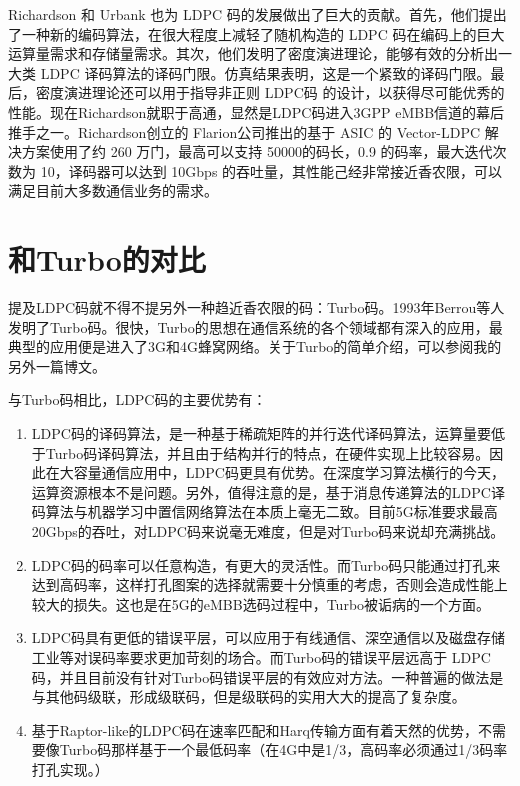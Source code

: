 \documentclass[10pt,a4paper,UTF8]{article}
\begin{document}
Richardson 和 Urbank 也为 LDPC 码的发展做出了巨大的贡献。首先，他们提出了一种新的编码算法，在很大程度上减轻了随机构造的 LDPC 码在编码上的巨大运算量需求和存储量需求。其次，他们发明了密度演进理论，能够有效的分析出一大类 LDPC 译码算法的译码门限。仿真结果表明，这是一个紧致的译码门限。最后，密度演进理论还可以用于指导非正则 LDPC码 的设计，以获得尽可能优秀的性能。现在Richardson就职于高通，显然是LDPC码进入3GPP eMBB信道的幕后推手之一。Richardson创立的 Flarion公司推出的基于 ASIC 的 Vector-LDPC 解决方案使用了约 260 万门，最高可以支持 50000的码长，0.9 的码率，最大迭代次数为 10，译码器可以达到 10Gbps 的吞吐量，其性能己经非常接近香农限，可以满足目前大多数通信业务的需求。
\section{和Turbo的对比}
\label{sec:org4bad585}


提及LDPC码就不得不提另外一种趋近香农限的码：Turbo码。1993年Berrou等人发明了Turbo码。很快，Turbo的思想在通信系统的各个领域都有深入的应用，最典型的应用便是进入了3G和4G蜂窝网络。关于Turbo的简单介绍，可以参阅我的另外一篇博文。

与Turbo码相比，LDPC码的主要优势有：
\begin{enumerate}
\item LDPC码的译码算法，是一种基于稀疏矩阵的并行迭代译码算法，运算量要低于Turbo码译码算法，并且由于结构并行的特点，在硬件实现上比较容易。因此在大容量通信应用中，LDPC码更具有优势。在深度学习算法横行的今天，运算资源根本不是问题。另外，值得注意的是，基于消息传递算法的LDPC译码算法与机器学习中置信网络算法在本质上毫无二致。目前5G标准要求最高20Gbps的吞吐，对LDPC码来说毫无难度，但是对Turbo码来说却充满挑战。

\item LDPC码的码率可以任意构造，有更大的灵活性。而Turbo码只能通过打孔来达到高码率，这样打孔图案的选择就需要十分慎重的考虑，否则会造成性能上较大的损失。这也是在5G的eMBB选码过程中，Turbo被诟病的一个方面。

\item LDPC码具有更低的错误平层，可以应用于有线通信、深空通信以及磁盘存储工业等对误码率要求更加苛刻的场合。而Turbo码的错误平层远高于 LDPC码，并且目前没有针对Turbo码错误平层的有效应对方法。一种普遍的做法是与其他码级联，形成级联码，但是级联码的实用大大的提高了复杂度。

\item 基于Raptor-like的LDPC码在速率匹配和Harq传输方面有着天然的优势，不需要像Turbo码那样基于一个最低码率（在4G中是1/3，高码率必须通过1/3码率打孔实现。）
\end{enumerate}
\end{document}
